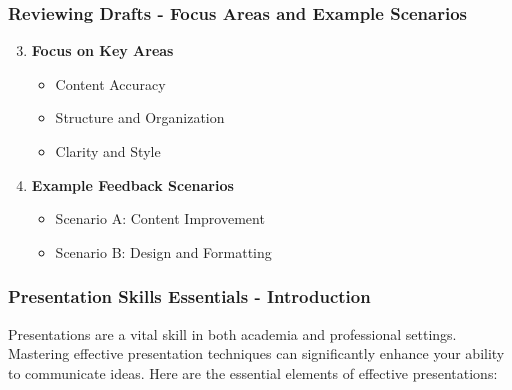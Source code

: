 \documentclass[aspectratio=169]{beamer}
\begin{document}
\begin{frame}[fragile]
    \frametitle{Reviewing Drafts - Focus Areas and Example Scenarios}
    \begin{enumerate}
        \setcounter{enumi}{2} %
        \item \textbf{Focus on Key Areas}
            \begin{itemize}
                \item Content Accuracy
                \item Structure and Organization
                \item Clarity and Style
            \end{itemize}

        \item \textbf{Example Feedback Scenarios}
            \begin{itemize}
                \item Scenario A: Content Improvement
                \item Scenario B: Design and Formatting
            \end{itemize}
    \end{enumerate}
\end{frame}

\begin{frame}[fragile]
    \frametitle{Presentation Skills Essentials - Introduction}
    Presentations are a vital skill in both academia and professional settings. Mastering effective presentation techniques can significantly enhance your ability to communicate ideas. Here are the essential elements of effective presentations:
\end{frame}
\end{document}
